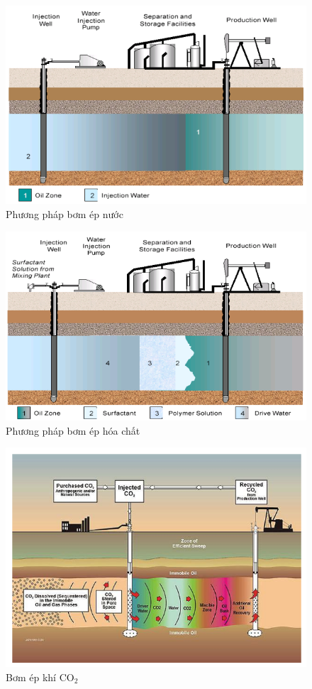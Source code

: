\documentclass[12pt,a4paper]{article}
\begin{document}
	\begin{figure}[h]
		\centering
		\includegraphics[scale=.7]{Fig/Waterflooding.PNG}
		\caption{Phương pháp bơm ép nước \cite{Petropedia}}
	\end{figure}
	\begin{figure}[h]
		\centering
		\includegraphics[scale=.7]{Fig/Chemical.PNG}
		\caption{Phương pháp bơm ép hóa chất \cite{el2017hydrophobic}}
	\end{figure}
	\clearpage
	\begin{figure}[h]
		\centering
		\includegraphics[scale=.7]{Fig/CO2.PNG}
		\caption{Bơm ép khí CO$_2$ \cite{CO2Solution}}
	\end{figure}
\end{document}

